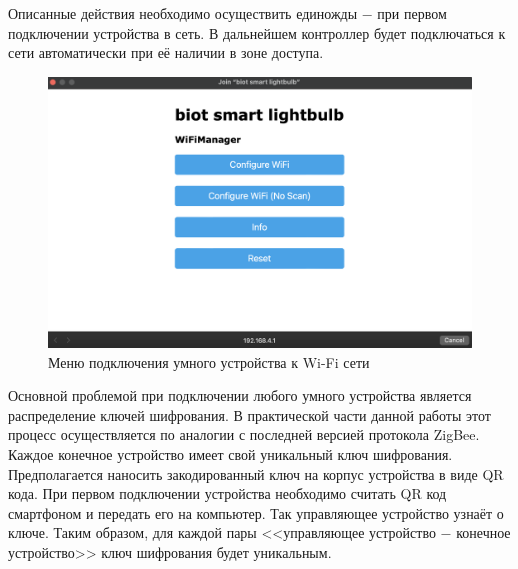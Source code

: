 	Описанные действия необходимо осуществить единожды $-$ при первом подключении устройства в сеть.
	В дальнейшем контроллер будет подключаться к сети автоматически при её наличии в зоне доступа.
	
	\begin{figure}[H]
		\centering
		\includegraphics[scale=0.5]{resources/wifi-manager-1}
		\caption{Меню подключения умного устройства к Wi-Fi сети}
		\label{fig4.3}
	\end{figure}

	Основной проблемой при подключении любого умного устройства является распределение ключей
	шифрования. В практической части данной работы этот процесс осуществляется по аналогии с последней
	версией протокола ZigBee. Каждое конечное устройство имеет свой уникальный ключ шифрования.
	Предполагается наносить закодированный ключ на корпус устройства в виде QR кода. При первом подключении
	устройства необходимо считать QR код смартфоном и передать его на компьютер. Так управляющее
	устройство узнаёт о ключе. Таким образом, для каждой пары <<управляющее устройство $-$ конечное 
	устройство>> ключ шифрования будет уникальным.
	
